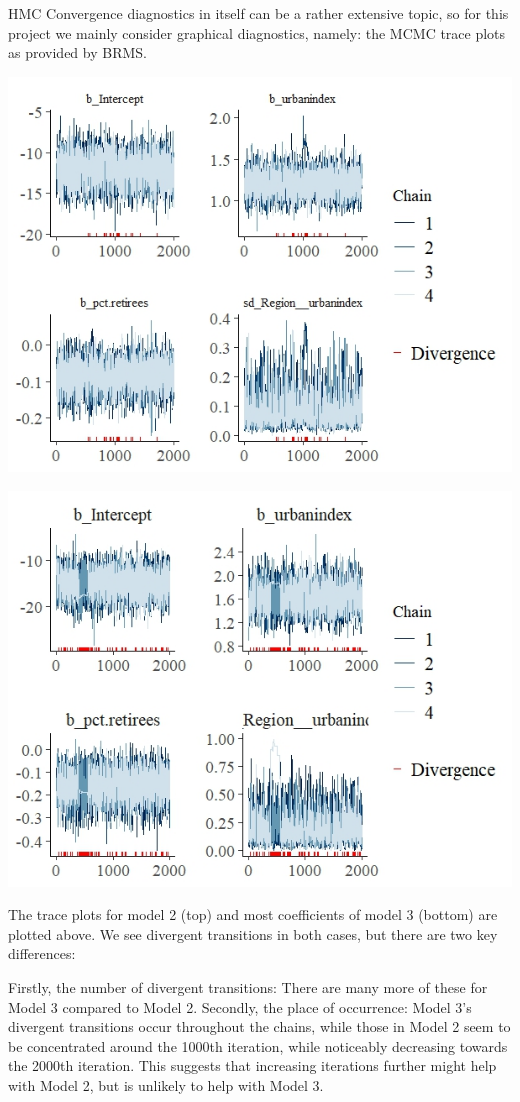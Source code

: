 \documentclass[12pt]{article}
\begin{document}
HMC Convergence diagnostics in itself can be a rather extensive topic, so for this project we mainly consider graphical diagnostics, namely: the MCMC trace plots as provided by BRMS.

\includegraphics[scale = 1.2]{trace_plots/trace_model2.jpeg}

\includegraphics[scale = 1.2]{trace_plots/trace_model3_part1.jpeg}

The trace plots for model 2 (top) and most coefficients of model 3 (bottom) are plotted above. We see divergent transitions in both cases, but there are two key differences:

Firstly, the number of divergent transitions: There are many more of these for Model 3 compared to Model 2. Secondly, the place of occurrence: Model 3's divergent transitions occur throughout the chains, while those in Model 2 seem to be concentrated around the 1000th iteration, while noticeably decreasing towards the 2000th iteration. This suggests that increasing iterations further might help with Model 2, but is unlikely to help with Model 3.
\end{document}
